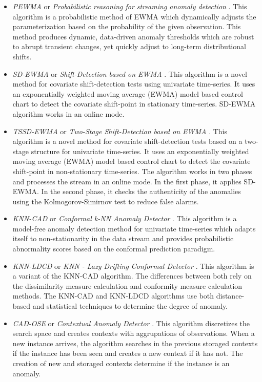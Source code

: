 \documentclass[a4paper]{article}\usepackage[]{graphicx}\usepackage[]{color}
\begin{document}
\begin{itemize}

\item \emph{PEWMA} or \emph{Probabilistic reasoning for streaming anomaly detection} \cite{pewma}. This algorithm is a probabilistic method of EWMA which dynamically adjusts the parameterization based on the probability of the given observation. This method produces dynamic, data-driven anomaly thresholds which are robust to abrupt transient changes, yet quickly adjust to long-term distributional shifts.

\item \emph{SD-EWMA} or \emph{Shift-Detection based on EWMA} \cite{Raza}. This algorithm is a novel method for covariate shift-detection tests using univariate time-series. It uses an exponentially weighted moving average (EWMA) model based control chart to detect the covariate shift-point in stationary time-series. SD-EWMA algorithm works in an online mode.

\item \emph{TSSD-EWMA} or \emph{Two-Stage Shift-Detection based on EWMA} \cite{Raza}. This algorithm is a novel method for covariate shift-detection tests based on a two-stage structure for univariate time-series. It uses an exponentially weighted moving average (EWMA) model based control chart to detect the covariate shift-point in non-stationary time-series. The algorithm works in two phases and processes the stream in an online mode. In the first phase, it applies SD-EWMA. In the second phase, it checks the authenticity of the anomalies using the Kolmogorov-Simirnov test to reduce false alarms.

\item \emph{KNN-CAD} or \emph{Conformal k-NN Anomaly Detector} \cite{2016arXiv160804585B}. This algorithm is a model-free anomaly detection method for univariate time-series which adapts itself to non-stationarity in the data stream and provides probabilistic abnormality scores based on the conformal prediction paradigm.

\item \emph{KNN-LDCD} or \emph{KNN - Lazy Drifting Conformal Detector} \cite{2017arXiv170603412I}. This algorithm is a variant of the KNN-CAD algorithm. The differences between both rely on the dissimilarity measure calculation and conformity measure calculation methods. The KNN-CAD and KNN-LDCD algorithms use both distance-based and statistical techniques to determine the degree of anomaly.

\item \emph{CAD-OSE} or \emph{Contextual Anomaly Detector} \cite{2018-Smirnov-ContextualAnomalyDetector}. This algorithm discretizes the search space and creates contexts with aggrupations of observations. When a new instance arrives, the algorithm searches in the previous storaged contexts if the instance has been seen and creates a new context if it has not. The creation of new and storaged contexts determine if the instance is an anomaly.

\end{itemize}
\end{document}

